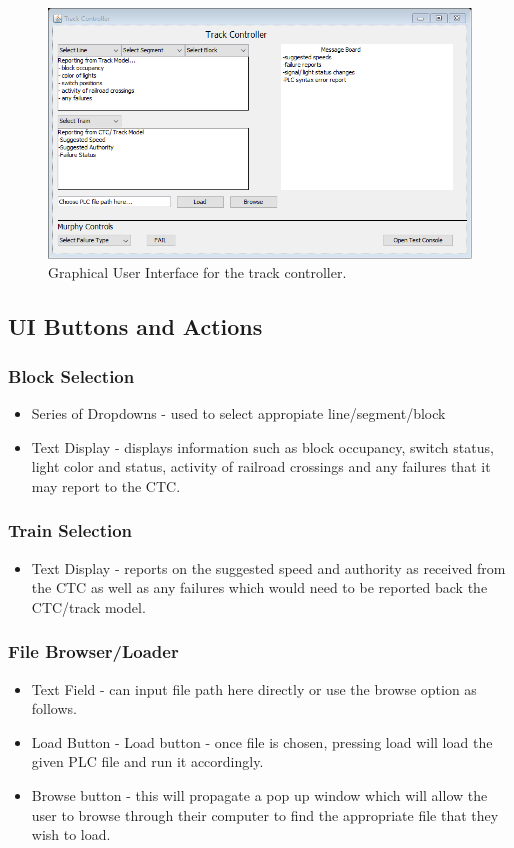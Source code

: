 \documentclass[letterpaper]{article}
\begin{document}
\begin{figure}[h!]
	\center
	\includegraphics[width=16cm]{trackcontroller_gui}
	\caption{Graphical User Interface for the track controller.}
\end{figure}


\subsection{UI Buttons and Actions}

\subsubsection{Block Selection}
\begin{itemize}
	\item Series of Dropdowns - used to select appropiate line/segment/block
	\item Text Display - displays information such as block occupancy, switch status, light color and status, activity of railroad crossings and any failures that it may report to the CTC.
\end{itemize}
\subsubsection{Train Selection}
\begin{itemize}
	\item Text Display - reports on the suggested speed and authority as received from the CTC as well as any failures which would need to be reported back the CTC/track model.
\end{itemize}
\subsubsection{File Browser/Loader}
\begin{itemize}
	\item Text Field - can input file path here directly or use the browse option as follows.
	\item Load Button - Load button - once file is chosen, pressing load will load the given PLC file and run it accordingly.
	\item Browse button - this will propagate a pop up window which will allow the user to browse through their computer to find the appropriate file that they wish to load.
\end{itemize}
\end{document}
